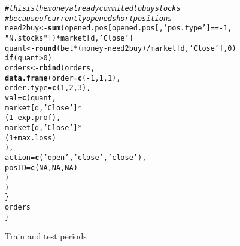\documentclass{article}\usepackage[]{graphicx}\usepackage[]{color}
\makeatletter
\newcommand{\hlnum}[1]{\textcolor[rgb]{0.686,0.059,0.569}{#1}}%
\newcommand{\hlstr}[1]{\textcolor[rgb]{0.192,0.494,0.8}{#1}}%
\newcommand{\hlcom}[1]{\textcolor[rgb]{0.678,0.584,0.686}{\textit{#1}}}%
\newcommand{\hlopt}[1]{\textcolor[rgb]{0,0,0}{#1}}%
\newcommand{\hlstd}[1]{\textcolor[rgb]{0.345,0.345,0.345}{#1}}%
\newcommand{\hlkwa}[1]{\textcolor[rgb]{0.161,0.373,0.58}{\textbf{#1}}}%
\newcommand{\hlkwb}[1]{\textcolor[rgb]{0.69,0.353,0.396}{#1}}%
\newcommand{\hlkwc}[1]{\textcolor[rgb]{0.333,0.667,0.333}{#1}}%
\newcommand{\hlkwd}[1]{\textcolor[rgb]{0.737,0.353,0.396}{\textbf{#1}}}%
\newenvironment{kframe}{%
 \def\at@end@of@kframe{}%
 \ifinner\ifhmode%
  \def\at@end@of@kframe{\end{minipage}}%
  \begin{minipage}{\columnwidth}%
 \fi\fi%
 \def\FrameCommand##1{\hskip\@totalleftmargin \hskip-\fboxsep
 \colorbox{shadecolor}{##1}\hskip-\fboxsep
     \hskip-\linewidth \hskip-\@totalleftmargin \hskip\columnwidth}%
 \MakeFramed {\advance\hsize-\width
   \@totalleftmargin\z@ \linewidth\hsize
   \@setminipage}}%
 {\par\unskip\endMakeFramed%
 \at@end@of@kframe}
\newenvironment{knitrout}{}{} %
\makeatother
\begin{document}
\begin{knitrout}
\begin{kframe}
\begin{alltt}
    \hlcom{#this is the money already commited to buy stocks}
    \hlcom{#because of currently opened short positions}
    \hlstd{need2buy} \hlkwb{<-} \hlkwd{sum}\hlstd{(opened.pos[opened.pos[,} \hlstr{'pos.type'}\hlstd{]} \hlopt{== -}\hlnum{1}\hlstd{,}
                               \hlstr{"N.stocks"}\hlstd{])}\hlopt{*}\hlstd{market[d,} \hlstr{'Close'}\hlstd{]}
    \hlstd{quant} \hlkwb{<-} \hlkwd{round}\hlstd{(bet}\hlopt{*}\hlstd{(money} \hlopt{-} \hlstd{need2buy)}\hlopt{/}\hlstd{market[d,} \hlstr{'Close'}\hlstd{],} \hlnum{0}\hlstd{)}
    \hlkwa{if}\hlstd{(quant} \hlopt{>}\hlnum{0}\hlstd{)}
      \hlstd{orders} \hlkwb{<-} \hlkwd{rbind}\hlstd{(orders,}
                      \hlkwd{data.frame}\hlstd{(}\hlkwc{order} \hlstd{=} \hlkwd{c}\hlstd{(}\hlopt{-}\hlnum{1}\hlstd{,} \hlnum{1}\hlstd{,} \hlnum{1}\hlstd{),}
                                 \hlkwc{order.type} \hlstd{=} \hlkwd{c}\hlstd{(}\hlnum{1}\hlstd{,} \hlnum{2}\hlstd{,} \hlnum{3}\hlstd{),}
                                 \hlkwc{val} \hlstd{=} \hlkwd{c}\hlstd{(quant,}
                                         \hlstd{market[d,} \hlstr{'Close'}\hlstd{]}\hlopt{*}
                                           \hlstd{(}\hlnum{1}\hlopt{-}\hlstd{exp.prof),}
                                         \hlstd{market[d,} \hlstr{'Close'}\hlstd{]}\hlopt{*}
                                           \hlstd{(}\hlnum{1} \hlopt{+} \hlstd{max.loss)}
                                         \hlstd{),}
                                 \hlkwc{action} \hlstd{=} \hlkwd{c}\hlstd{(}\hlstr{'open'}\hlstd{,} \hlstr{'close'}\hlstd{,} \hlstr{'close'}\hlstd{),}
                                 \hlkwc{posID} \hlstd{=} \hlkwd{c}\hlstd{(}\hlnum{NA}\hlstd{,} \hlnum{NA}\hlstd{,} \hlnum{NA}\hlstd{)}
                                 \hlstd{)}
                      \hlstd{)}
  \hlstd{\}}
  \hlstd{orders}
\hlstd{\}}
\end{alltt}
\end{kframe}
\end{knitrout}
Train and test periods
\end{document}
